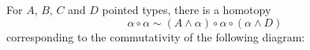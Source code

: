 \documentclass{article}
\newcommand{\smsh}{\wedge}
\renewcommand{\o}{\ensuremath{\circ}}
\begin{document}
\begin{thm}\label{thm:smash-associativity-pentagon}
	For $A$, $B$, $C$ and $D$ pointed types, there is a homotopy
	\[\alpha \o \alpha \sim (A \smsh \alpha) \o \alpha \o (\alpha \smsh D)\]
	corresponding to the commutativity of the following diagram:
	\begin{center}
	\end{center}
\end{thm}
\end{document}
